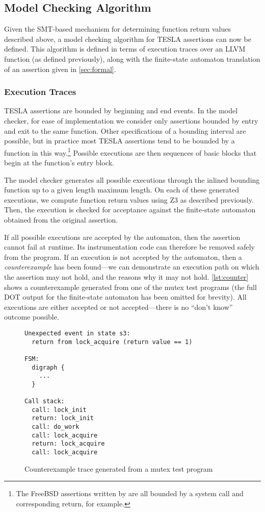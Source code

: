 \subsection{Model Checking Algorithm} \label{sec:mc}

Given the SMT-based mechanism for determining function return values described
above, a model checking algorithm for TESLA assertions can now be defined. This
algorithm is defined in terms of execution traces over an LLVM function (as
defined previously), along with the finite-state automaton translation of an
assertion given in \autoref{sec:formal}.

\subsubsection{Execution Traces}

TESLA assertions are bounded by beginning and end events. In the model checker,
for ease of implementation we consider only assertions bounded by entry and exit
to the same function. Other specifications of a bounding interval are possible,
but in practice most TESLA assertions tend to be bounded by a function in this
way.\footnote{The FreeBSD assertions written by \textcite{anderson_tesla:_2014}
are all bounded by a system call and corresponding return, for example.}
Possible executions are then sequences of basic blocks that begin at the
function's entry block.

The model checker generates all possible executions through the inlined bounding
function up to a given length maximum length. On each of these generated
executions, we compute function return values using Z3 as described previously.
Then, the execution is checked for acceptance against the finite-state automaton
obtained from the original assertion.

If all possible executions are accepted by the automaton, then the assertion
cannot fail at runtime. Its instrumentation code can therefore be removed safely
from the program. If an execution is not accepted by the automaton, then a
\emph{counterexample} has been found---we can demonstrate an execution path on
which the assertion may not hold, and the reasons why it may not hold.
\autoref{lst:counter} shows a counterexample generated from one of the mutex
test programs (the full DOT output for the finite-state automaton has been
omitted for brevity). All executions are either accepted or not accepted---there
is no ``don't know'' outcome possible.

\begin{figure}
  \begin{verbatim}
Unexpected event in state s3:
  return from lock_acquire (return value == 1)

FSM:
  digraph {
    ...
  }

Call stack:
  call: lock_init
  return: lock_init
  call: do_work
  call: lock_acquire
  return: lock_acquire
  call: lock_acquire
  \end{verbatim}
  \caption{Counterexample trace generated from a mutex test program}
  \label{lst:counter}
\end{figure}

